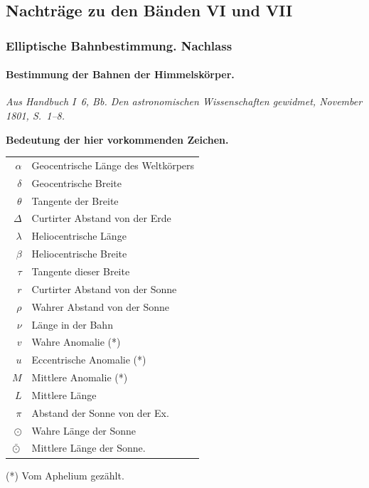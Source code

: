\documentclass[12pt,a4paper]{article}
\theoremstyle{plain}
\theoremstyle{definition}
\theoremstyle{remark}
\begin{document}
\subsection*{Nachträge zu den Bänden VI und VII}

\subsubsection*{Elliptische Bahnbestimmung. Nachlass}

\paragraph{Bestimmung der Bahnen der Himmelskörper.}
\textit{Aus Handbuch I~6, Bb. Den astronomischen Wissenschaften gewidmet, November 1801, S.~1--8.}

\medskip

\textbf{Bedeutung der hier vorkommenden Zeichen.}

\begin{center}
\begin{tabular}{r@{\quad}p{8cm}}
$\alpha$ & Geocentrische Länge des Weltkörpers \\
$\delta$ & Geocentrische Breite \\
$\theta$ & Tangente der Breite \\
$\Delta$ & Curtirter Abstand von der Erde \\
$\lambda$ & Heliocentrische Länge \\
$\beta$ & Heliocentrische Breite \\
$\tau$ & Tangente dieser Breite \\
$r$ & Curtirter Abstand von der Sonne \\
$\rho$ & Wahrer Abstand von der Sonne \\
$\nu$ & Länge in der Bahn \\
$v$ & Wahre Anomalie (*) \\
$u$ & Eccentrische Anomalie (*) \\
$M$ & Mittlere Anomalie (*) \\
$L$ & Mittlere Länge \\
$\pi$ & Abstand der Sonne von der Ex. \\
$\odot$ & Wahre Länge der Sonne \\
$\bar{\odot}$ & Mittlere Länge der Sonne.
\end{tabular}
\end{center}
(*) Vom Aphelium gezählt.
\end{document}
